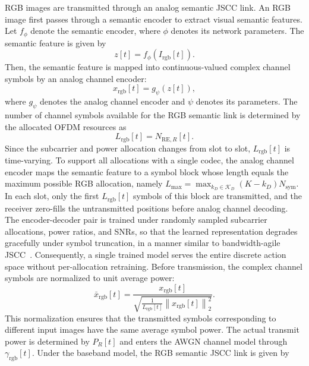 \documentclass[journal]{IEEEtran}
\begin{document}
RGB images are transmitted through an analog semantic JSCC link. An RGB image first passes through a semantic encoder to extract visual semantic features. Let $f_{\phi}$ denote the semantic encoder, where $\phi$ denotes its network parameters. The semantic feature is given by
\begin{equation}
z[t]
=
f_{\phi}
\left(
I_{\mathrm{rgb}}[t]
\right).
\end{equation}
Then, the semantic feature is mapped into continuous-valued complex channel symbols by an analog channel encoder:
\begin{equation}
x_{\mathrm{rgb}}[t]
=
g_{\psi}
\left(
z[t]
\right),
\end{equation}
where $g_{\psi}$ denotes the analog channel encoder and $\psi$ denotes its parameters. The number of channel symbols available for the RGB semantic link is determined by the allocated OFDM resources as
\begin{equation}
L_{\mathrm{rgb}}[t]
=
N_{\mathrm{RE},R}[t].
\end{equation}
Since the subcarrier and power allocation changes from slot to slot, $L_{\mathrm{rgb}}[t]$ is time-varying. To support all allocations with a single codec, the analog channel encoder maps the semantic feature to a symbol block whose length equals the maximum possible RGB allocation, namely $L_{\max}=\max_{k_D\in\mathcal{K}_D}(K-k_D)N_{\mathrm{sym}}$. In each slot, only the first $L_{\mathrm{rgb}}[t]$ symbols of this block are transmitted, and the receiver zero-fills the untransmitted positions before analog channel decoding. The encoder-decoder pair is trained under randomly sampled subcarrier allocations, power ratios, and SNRs, so that the learned representation degrades gracefully under symbol truncation, in a manner similar to bandwidth-agile JSCC~\cite{B3}. Consequently, a single trained model serves the entire discrete action space without per-allocation retraining.
Before transmission, the complex channel symbols are normalized to unit average power:
\begin{equation}
\bar{x}_{\mathrm{rgb}}[t]
=
\frac{
x_{\mathrm{rgb}}[t]
}
{
\sqrt{
\frac{1}{L_{\mathrm{rgb}}[t]}
\left\|
x_{\mathrm{rgb}}[t]
\right\|_2^2
}
}.
\end{equation}
This normalization ensures that the transmitted symbols corresponding to different input images have the same average symbol power. The actual transmit power is determined by $P_R[t]$ and enters the AWGN channel model through $\gamma_{\mathrm{rgb}}[t]$. Under the baseband model, the RGB semantic JSCC link is given by
\end{document}
